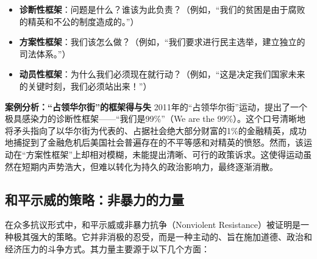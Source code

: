 \begin{enumerate}
    \begin{itemize}
        \item \textbf{诊断性框架}：问题是什么？谁该为此负责？（例如，“我们的贫困是由于腐败的精英和不公的制度造成的。”）
        \item \textbf{方案性框架}：我们该怎么做？（例如，“我们要求进行民主选举，建立独立的司法体系。”）
        \item \textbf{动员性框架}：为什么我们必须现在就行动？（例如，“这是决定我们国家未来的关键时刻，我们必须站出来！”）
    \end{itemize}

    \textbf{案例分析：“占领华尔街”的框架得与失}
    2011年的“占领华尔街”运动，提出了一个极具感染力的诊断性框架——“我们是99\%”（We are the 99\%）。这个口号清晰地将矛头指向了以华尔街为代表的、占据社会绝大部分财富的1\%的金融精英，成功地捕捉到了金融危机后美国社会普遍存在的不平等感和对精英的愤怒。然而，该运动在“方案性框架”上却相对模糊，未能提出清晰、可行的政策诉求。这使得运动虽然在短期内声势浩大，但难以转化为持久的政治影响力，最终逐渐消散。
\end{enumerate}

\subsection{和平示威的策略：非暴力的力量}

在众多抗议形式中，和平示威或非暴力抗争（Nonviolent Resistance）被证明是一种极其强大的策略。它并非消极的忍受，而是一种主动的、旨在施加道德、政治和经济压力的斗争方式。其力量主要源于以下几个方面：

